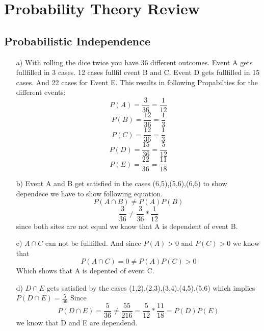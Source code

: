 \documentclass{article}
\begin{document}
\section{Probability Theory Review}
\subsection{Probabilistic Independence}
\begin{itemize}
	\item[a)]
	With rolling the dice twice you have 36 different outcomes. Event A gets fullfilled in 3 cases. 12 cases fullfil event B and C. Event D gets fullfilled in 15 cases. And 22 cases for Event E.
	This results in following Propabilties for the different events:
	$$P(A) = \frac{3}{36}=\frac{1}{12}$$$$P(B) =\frac{12}{36}=\frac{1}{3}$$$$ P(C) = \frac{12}{36}=\frac{1}{3}$$$$P(D) = \frac{15}{36}=\frac{5}{12}$$$$P(E) = \frac{22}{36}=\frac{11}{18}$$ 
	\item[b)] Event A and B get satisfied in the cases (6,5),(5,6),(6,6) to show dependece we have to show following equation.
	$$P(A \cap B) \neq P(A)P(B)$$
	$$\frac{3}{36} \neq \frac{3}{36}*\frac{1}{12}$$
	since both sites are not equal we know that A is dependent of event B.
	\item[c)]
	$A\cap C$ can not be fullfilled. And since $P(A)>0$ and $P(C)>0$ we know that
	$$P(A\cap C) = 0 \neq P(A)P(C)>0$$
	Which shows that A is depented of event C.
	\item[d)]
	$D\cap E$ gets satisfied by the cases (1,2),(2,3),(3,4),(4,5),(5,6) which implies $P(D\cap E)=\frac{5}{36}$
	Since $$P(D\cap E) = \frac{5}{36} \neq \frac{55}{216}=\frac{5}{12}*\frac{11}{18} = P(D)P(E)$$ we know that D and E are dependend.
\end{itemize}
\end{document}
